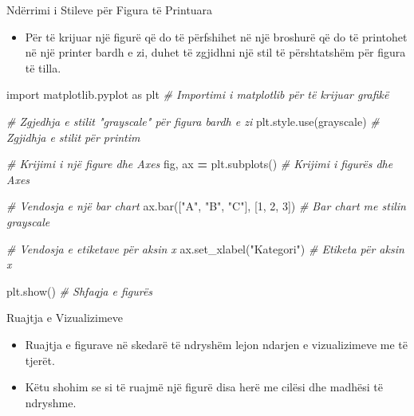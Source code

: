 \documentclass[
  ignorenonframetext,
]{beamer}
\newenvironment{Shaded}{\begin{snugshade}}{\end{snugshade}}
\newcommand{\CommentTok}[1]{\textcolor[rgb]{0.56,0.35,0.01}{\textit{#1}}}
\newcommand{\DecValTok}[1]{\textcolor[rgb]{0.00,0.00,0.81}{#1}}
\newcommand{\ImportTok}[1]{#1}
\newcommand{\NormalTok}[1]{#1}
\newcommand{\OperatorTok}[1]{\textcolor[rgb]{0.81,0.36,0.00}{\textbf{#1}}}
\newcommand{\StringTok}[1]{\textcolor[rgb]{0.31,0.60,0.02}{#1}}
\providecommand{\tightlist}{%
  \setlength{\itemsep}{0pt}\setlength{\parskip}{0pt}}
\begin{document}
\begin{frame}[fragile]{Ndërrimi i Stileve për Figura të Printuara}
\protect\hypertarget{nduxebrrimi-i-stileve-puxebr-figura-tuxeb-printuara}{}
\begin{itemize}
\tightlist
\item
  Për të krijuar një figurë që do të përfshihet në një broshurë që do të
  printohet në një printer bardh e zi, duhet të zgjidhni një stil të
  përshtatshëm për figura të tilla.
\end{itemize}


\begin{Shaded}
\begin{Highlighting}[]
\ImportTok{import}\NormalTok{ matplotlib.pyplot }\ImportTok{as}\NormalTok{ plt  }\CommentTok{\# Importimi i matplotlib për të krijuar grafikë}


\CommentTok{\# Zgjedhja e stilit "grayscale" për figura bardh e zi}
\NormalTok{plt.style.use(}\StringTok{\textquotesingle{}grayscale\textquotesingle{}}\NormalTok{)  }\CommentTok{\# Zgjidhja e stilit për printim}

\CommentTok{\# Krijimi i një figure dhe Axes}
\NormalTok{fig, ax }\OperatorTok{=}\NormalTok{ plt.subplots()  }\CommentTok{\# Krijimi i figurës dhe Axes}

\CommentTok{\# Vendosja e një bar chart}
\NormalTok{ax.bar([}\StringTok{"A"}\NormalTok{, }\StringTok{"B"}\NormalTok{, }\StringTok{"C"}\NormalTok{], [}\DecValTok{1}\NormalTok{, }\DecValTok{2}\NormalTok{, }\DecValTok{3}\NormalTok{])  }\CommentTok{\# Bar chart me stilin grayscale}

\CommentTok{\# Vendosja e etiketave për aksin x}
\NormalTok{ax.set\_xlabel(}\StringTok{"Kategori"}\NormalTok{)  }\CommentTok{\# Etiketa për aksin x}

\NormalTok{plt.show()  }\CommentTok{\# Shfaqja e figurës}
\end{Highlighting}
\end{Shaded}
\end{frame}

\begin{frame}{Ruajtja e Vizualizimeve}
\protect\hypertarget{ruajtja-e-vizualizimeve}{}
\begin{itemize}
\item
  Ruajtja e figurave në skedarë të ndryshëm lejon ndarjen e
  vizualizimeve me të tjerët.
\item
  Këtu shohim se si të ruajmë një figurë disa herë me cilësi dhe madhësi
  të ndryshme.
\end{itemize}
\end{frame}
\end{document}
